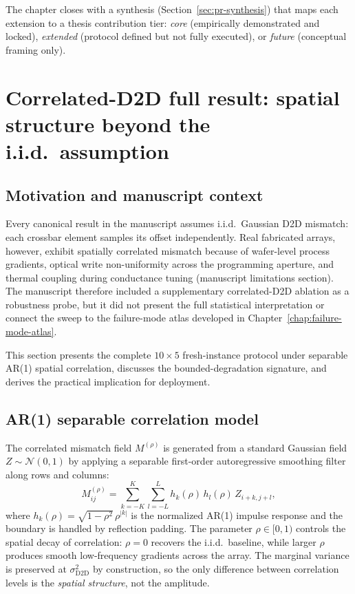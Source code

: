 The chapter closes with a synthesis (Section~\ref{sec:pr-synthesis}) that maps each extension to a thesis contribution tier: \emph{core} (empirically demonstrated and locked), \emph{extended} (protocol defined but not fully executed), or \emph{future} (conceptual framing only).


\section{Correlated-D2D full result: spatial structure beyond the i.i.d.~assumption}
\label{sec:correlated-d2d-full}

\subsection{Motivation and manuscript context}

Every canonical result in the manuscript assumes i.i.d.~Gaussian D2D mismatch: each crossbar element samples its offset independently.  Real fabricated arrays, however, exhibit spatially correlated mismatch because of wafer-level process gradients, optical write non-uniformity across the programming aperture, and thermal coupling during conductance tuning (manuscript limitations section).  The manuscript therefore included a supplementary correlated-D2D ablation as a robustness probe, but it did not present the full statistical interpretation or connect the sweep to the failure-mode atlas developed in Chapter~\ref{chap:failure-mode-atlas}.

This section presents the complete $10 \times 5$ fresh-instance protocol under separable AR(1) spatial correlation, discusses the bounded-degradation signature, and derives the practical implication for deployment.

\subsection{AR(1) separable correlation model}

The correlated mismatch field $M^{(\rho)}$ is generated from a standard Gaussian field $Z \sim \mathcal{N}(0,1)$ by applying a separable first-order autoregressive smoothing filter along rows and columns:
\begin{equation}
    M^{(\rho)}_{ij} = \sum_{k=-K}^{K} \sum_{l=-L}^{L} h_{k}(\rho)\, h_{l}(\rho)\, Z_{i+k,j+l},
    \label{eq:ar1-separable}
\end{equation}
where $h_{k}(\rho) = \sqrt{1-\rho^{2}}\, \rho^{|k|}$ is the normalized AR(1) impulse response and the boundary is handled by reflection padding.  The parameter $\rho \in [0,1)$ controls the spatial decay of correlation: $\rho=0$ recovers the i.i.d.~baseline, while larger $\rho$ produces smooth low-frequency gradients across the array.  The marginal variance is preserved at $\sigma^{2}_{\text{D2D}}$ by construction, so the only difference between correlation levels is the \emph{spatial structure}, not the amplitude.

